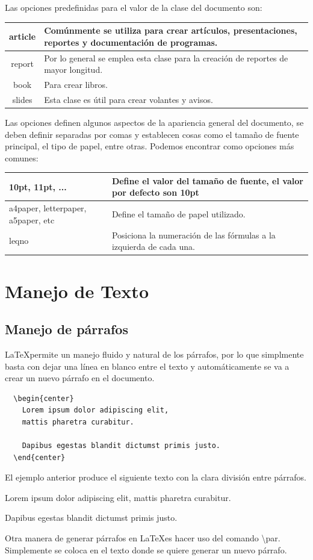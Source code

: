\documentclass[journal]{IEEEtran}
\begin{document}
Las opciones predefinidas para el valor de la clase del documento son:

\begin{tabular}[t]{|c|p{5cm}|}
  \hline
  article & Comúnmente se utiliza para crear artículos, presentaciones, reportes y documentación de programas. \\ \hline
  report & Por lo general se emplea esta clase para la creación de reportes de mayor longitud. \\ \hline
  book & Para crear libros. \\ \hline
  slides & Esta clase es útil para crear volantes y avisos. \\ \hline
\end{tabular}


Las opciones definen algunos aspectos de la apariencia general del documento, se deben
definir separadas por comas y establecen cosas como el tamaño de fuente principal, el tipo de papel, entre otras.
Podemos encontrar como opciones más comunes:
\begin{center}
  \begin{tabular}[t]{|m{2cm}|m{3cm}|}
    \hline
    10pt, 11pt, ... & Define el valor del tamaño de fuente, el valor por defecto son 10pt \\ \hline
    a4paper, letterpaper, a5paper, etc & Define el tamaño de papel utilizado. \\ \hline
    leqno & Posiciona la numeración de las fórmulas a la izquierda de cada una. \\ \hline
  \end{tabular}  
\end{center}




\section{Manejo de Texto}
\subsection{Manejo de párrafos}
\LaTeX permite un manejo fluido y natural de los párrafos, por lo que simplmente basta con dejar una línea en blanco entre el texto y automáticamente se va a crear un nuevo párrafo en el documento.
\begin{verbatim}
  \begin{center}
    Lorem ipsum dolor adipiscing elit, 
    mattis pharetra curabitur.
    
    Dapibus egestas blandit dictumst primis justo.
  \end{center}
\end{verbatim}
El ejemplo anterior produce el siguiente texto con la clara división entre párrafos.
\begin{center}
  Lorem ipsum dolor adipiscing elit, 
  mattis pharetra curabitur.
  
  Dapibus egestas blandit dictumst primis justo.
\end{center}
Otra manera de generar párrafos en \LaTeX es hacer uso del comando \textbackslash{}par.
Simplemente se coloca en el texto donde se quiere generar un nuevo párrafo.
\end{document}
